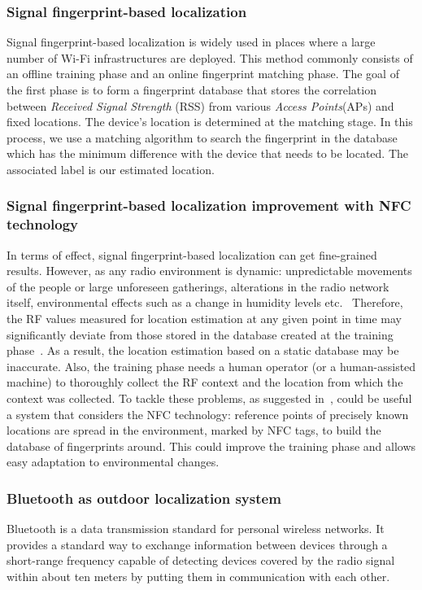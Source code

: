 \subsubsection{Signal fingerprint-based localization}
Signal fingerprint-based localization is widely used in places where a large number of Wi-Fi infrastructures are deployed.
This method commonly consists of an offline training phase and an online fingerprint matching phase.
The goal of the first phase is to form a fingerprint database that stores the correlation between \textit{Received Signal Strength} (RSS) from
various \textit{Access Points}(APs) and fixed locations. The device's location is determined at the matching stage.
In this process, we use a matching algorithm to search the fingerprint in the database which has the minimum difference with the device that needs to
be located. The associated label is our estimated location.

\subsubsection{Signal fingerprint-based localization improvement with NFC technology}
In terms of effect, signal fingerprint-based localization can get fine-grained results.
However, as any radio environment is dynamic: unpredictable movements of the people or large unforeseen gatherings,
alterations in the radio network itself, environmental effects such as a change in humidity levels etc.~\cite{chaudhry2013indoor}
Therefore, the RF values measured for location estimation at any given point in time may significantly deviate from
those stored in the database created at the training phase~\cite{chaudhry2013indoor}.
As a result, the location estimation based on a static database may be inaccurate.
Also, the training phase needs a human operator (or a human-assisted machine) to thoroughly collect the RF context and
the location from which the context was collected.
To tackle these problems, as suggested in~\cite{chaudhry2013indoor}, could be useful a system that considers the NFC technology:
reference points of precisely known locations are spread in the environment, marked by NFC tags, to build the database of fingerprints around.
This could improve the training phase and allows easy adaptation to environmental changes.

\subsubsection{Bluetooth as outdoor localization system}
Bluetooth is a data transmission standard for personal wireless networks. It provides a standard way to exchange information between
devices through a short-range frequency capable of detecting devices covered by the radio signal within about ten meters by putting them
in communication with each other.

